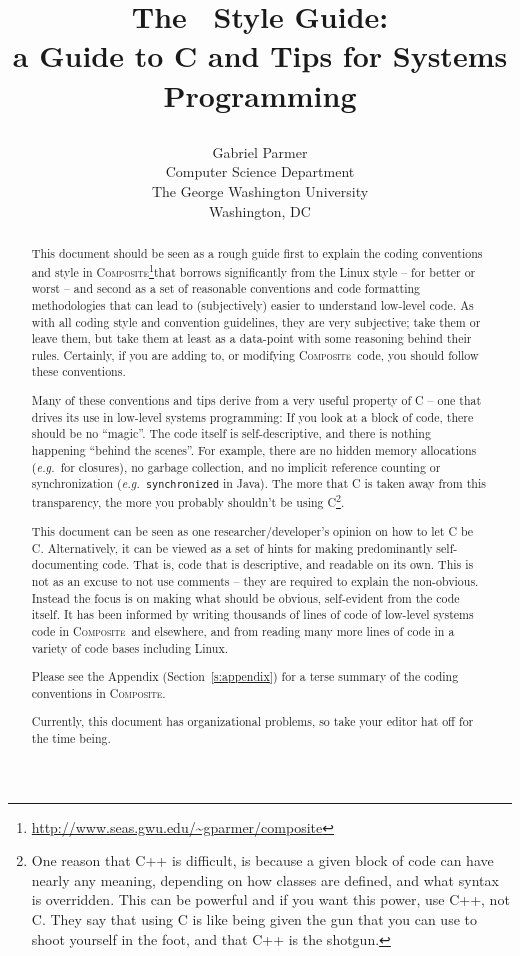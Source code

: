 \documentclass[11pt,onecolumn]{article}
\date{}
\title{\Large\bf The \composite\ Style Guide: \\
a Guide to C and Tips for Systems Programming\\
\author{Gabriel Parmer\\[0.05in]
Computer Science Department \\
The George Washington University\\
Washington, DC
}}
\def\composite{\textsc{Composite}}
\def\eg{\textit{e.g.}}
\begin{document}
\thispagestyle{empty}
\maketitle
\thispagestyle{empty}


%

%


\begin{abstract}
  This document should be seen as a rough guide first to explain the
  coding conventions and style in
  \composite\footnote{\url{http://www.seas.gwu.edu/~gparmer/composite}}that
  borrows significantly from the Linux style -- for better or worst --
  and second as a set of reasonable conventions and code formatting
  methodologies that can lead to (subjectively) easier to understand
  low-level code.  As with all coding style and convention guidelines,
  they are very subjective; take them or leave them, but take them at
  least as a data-point with some reasoning behind their rules.
  Certainly, if you are adding to, or modifying \composite\ code, you
  should follow these conventions.

  Many of these conventions and tips derive from a very useful
  property of C -- one that drives its use in low-level systems
  programming: If you look at a block of code, there should be no
  ``magic''.  The code itself is self-descriptive, and there is
  nothing happening ``behind the scenes''.  For example, there are no
  hidden memory allocations (\eg\ for closures), no garbage
  collection, and no implicit reference counting or synchronization
  (\eg\ {\tt synchronized} in Java).  The more that C is taken away
  from this transparency, the more you probably shouldn't be using
  C\footnote{One reason that C++ is difficult, is because a given
    block of code can have nearly any meaning, depending on how
    classes are defined, and what syntax is overridden.  This can be
    powerful and if you want this power, use C++, not C.  They say
    that using C is like being given the gun that you can use to shoot
    yourself in the foot, and that C++ is the shotgun.}.

  This document can be seen as one researcher/developer's opinion on
  how to let C be C.  Alternatively, it can be viewed as a set of
  hints for making predominantly self-documenting code.  That is, code
  that is descriptive, and readable on its own.  This is not as an
  excuse to not use comments -- they are required to explain the
  non-obvious.  Instead the focus is on making what should be obvious,
  self-evident from the code itself.  It has been informed by writing
  thousands of lines of code of low-level systems code in
  \composite\ and elsewhere, and from reading many more lines of code
  in a variety of code bases including Linux.

  Please see the Appendix (Section~\ref{s:appendix}) for a terse
  summary of the coding conventions in \composite.

  Currently, this document has organizational problems, so take your
  editor hat off for the time being.
\end{abstract}
\end{document}
